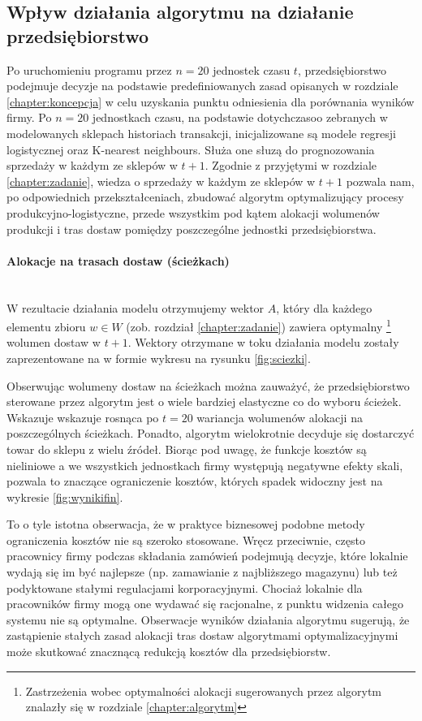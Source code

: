\documentclass[polish, twoside, 12pt, a4paper]{article}
\theoremstyle{definition}
\theoremstyle{plain}
\theoremstyle{remark}
\begin{document}
\subsection{Wpływ działania algorytmu na działanie przedsiębiorstwo} \label{chapter:wyniki}

Po uruchomieniu programu przez $n=20$ jednostek czasu $t$, przedsiębiorstwo podejmuje decyzje na podstawie predefiniowanych zasad opisanych w rozdziale \ref{chapter:koncepcja} w celu uzyskania punktu odniesienia dla porównania wyników firmy. Po $n=20$ jednostkach czasu, na podstawie dotychczasoo zebranych w modelowanych sklepach historiach transakcji, inicjalizowane są modele regresji logistycznej oraz K-nearest neighbours. Służa one słuzą do prognozowania sprzedaży w każdym ze sklepów w $t+1$. Zgodnie z przyjętymi w rozdziale \ref{chapter:zadanie}, wiedza o sprzedaży w każdym ze sklepów w $t+1$ pozwala nam, po odpowiednich przekształceniach, zbudować algorytm optymalizujący procesy produkcyjno-logistyczne, przede wszystkim pod kątem alokacji wolumenów produkcji i tras dostaw pomiędzy poszczególne jednostki przedsiębiorstwa. 

\paragraph{Alokacje na trasach dostaw (ścieżkach)}\mbox{}\\

W rezultacie działania modelu otrzymujemy wektor $A$, który dla każdego elementu zbioru $w \in W$ (zob. rozdział \ref{chapter:zadanie}) zawiera optymalny \footnote{Zastrzeżenia wobec optymalności alokacji sugerowanych przez algorytm znalazły się w rozdziale \ref{chapter:algorytm}} wolumen dostaw w $t+1$. Wektory otrzymane w toku działania modelu zostały zaprezentowane na w formie wykresu na rysunku \ref{fig:sciezki}.

Obserwując wolumeny dostaw na ścieżkach można zauważyć, że przedsiębiorstwo sterowane przez algorytm jest o wiele bardziej elastyczne co do wyboru ścieżek. Wskazuje wskazuje rosnąca po $t=20$ wariancja wolumenów alokacji na poszczególnych ścieżkach. Ponadto, algorytm wielokrotnie decyduje się dostarczyć towar do sklepu z wielu źródeł. Biorąc pod uwagę, że funkcje kosztów są nieliniowe a we wszystkich jednostkach firmy występują negatywne efekty skali, pozwala to znaczące ograniczenie kosztów, których spadek widoczny jest na wykresie \ref{fig:wynikifin}.

To o tyle istotna obserwacja, że w praktyce biznesowej podobne metody ograniczenia kosztów nie są szeroko stosowane. Wręcz przeciwnie, często pracownicy firmy podczas składania zamówień podejmują decyzje, które lokalnie wydają się im być najlepsze (np. zamawianie z najbliższego magazynu) lub też podyktowane stałymi regulacjami korporacyjnymi. Chociaż lokalnie dla pracowników firmy mogą one wydawać się racjonalne, z punktu widzenia całego systemu nie są optymalne. Obserwacje wyników działania algorytmu sugerują, że zastąpienie stałych zasad alokacji tras dostaw algorytmami optymalizacyjnymi może skutkować znacznącą redukcją kosztów dla przedsiębiorstw.
\end{document}
